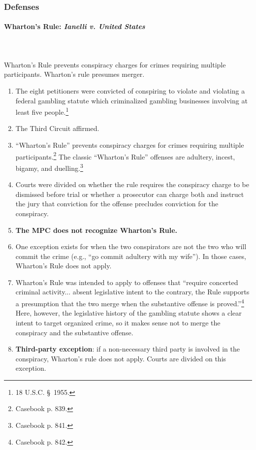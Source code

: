 \subsubsection{Defenses}

\paragraph{Wharton's Rule: \emph{Ianelli v. United States}}
~\\\\
Wharton's Rule prevents conspiracy charges for crimes requiring multiple 
participants. Wharton's rule presumes merger.

\begin{enumerate}
    \item The eight petitioners were convicted of conspiring to violate and 
    violating a federal gambling statute which criminalized gambling 
    businesses involving at least five people.\footnote{18 U.S.C. \S\ 1955.}
    \item The Third Circuit affirmed.
    \item ``Wharton's Rule'' prevents conspiracy charges for crimes requiring 
    multiple participants.\footnote{Casebook p. 839.} The classic ``Wharton's 
    Rule'' offenses are adultery, incest, bigamy, and 
    duelling.\footnote{Casebook p. 841.}
    \item Courts were divided on whether the rule requires the conspiracy 
    charge to be dismissed before trial or whether a prosecutor can charge 
    both and instruct the jury that conviction for the offense precludes 
    conviction for the conspiracy.
    \item \textbf{The MPC does not recognize Wharton's Rule.}
    \item One exception exists for when the two conspirators are not the two 
    who will commit the crime (e.g., ``go commit adultery with my wife''). In 
    those cases, Wharton's Rule does not apply.
    \item Wharton's Rule was intended to apply to offenses that ``require 
    concerted criminal activity... absent legislative intent to the contrary, 
    the Rule supports a presumption that the two merge when the substantive 
    offense is proved.''\footnote{Casebook p. 842.} Here, however, the 
    legislative history of the gambling statute shows a clear intent to target 
    organized crime, so it makes sense not to merge the conspiracy and the 
    substantive offense.
    \item \textbf{Third-party exception}: if a non-necessary third party is 
    involved in the conspiracy, Wharton's rule does not apply. Courts are 
    divided on this exception.
\end{enumerate}

